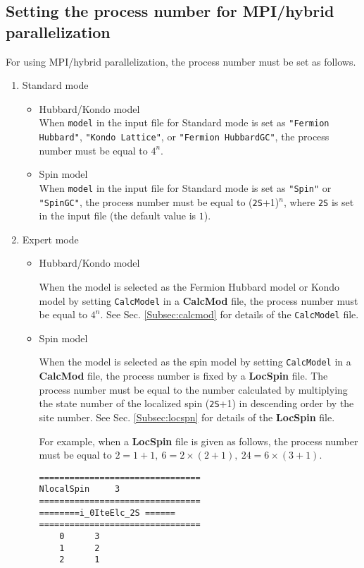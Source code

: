\newpage
\subsection{Setting the process number for MPI/hybrid parallelization}
\label{subsec:process}
For using MPI/hybrid parallelization, the process number must be set as follows.
\begin{enumerate}
\item{Standard mode}

\begin{itemize}
\item{Hubbard/Kondo model}\\
  When \verb|model| in the input file for Standard mode is set as
  \verb|"Fermion Hubbard"|, \verb|"Kondo Lattice"|, or \verb|"Fermion HubbardGC"|,
  the process number must be equal to $4^n$.

\item{Spin model}\\
  When \verb|model| in the input file for Standard mode is set as
  \verb|"Spin"| or \verb|"SpinGC"|, the process number must be equal to
  (\verb|2S|+1)${}^n$, where \verb|2S| is set in the input file
  (the default value is $1$).

\end{itemize}
\item{Expert mode}

\begin{itemize}
\item{Hubbard/Kondo model}

  When the model is selected as the Fermion Hubbard model or Kondo model
  by setting \verb|CalcModel| in a {\bf CalcMod} file,
  the process number must be equal to $4^n$.
  See Sec. \ref{Subsec:calcmod} for details of the \verb|CalcModel| file.

\item{Spin model}

  When the model is selected as the spin model by setting \verb|CalcModel|
  in a {\bf CalcMod} file, the process number is fixed by a {\bf LocSpin} file.
  The process number must be equal to the number calculated by
  multiplying the state number of the localized spin (\verb|2S|+1)
  in descending order by the site number.
  See Sec. \ref{Subsec:locspn} for details of the {\bf LocSpin} file.

  For example, when a {\bf LocSpin} file is given as follows,
  the process number must be equal to $2=1+1,~6=2\times(2+1),~24=6\times(3+1)$.
\begin{minipage}{10cm}
\begin{screen}
\begin{verbatim}
================================ 
NlocalSpin     3
================================ 
========i_0IteElc_2S ====== 
================================ 
    0      3
    1      2
    2      1
\end{verbatim}
\end{screen}
\end{minipage}


\end{itemize}
\end{enumerate}

